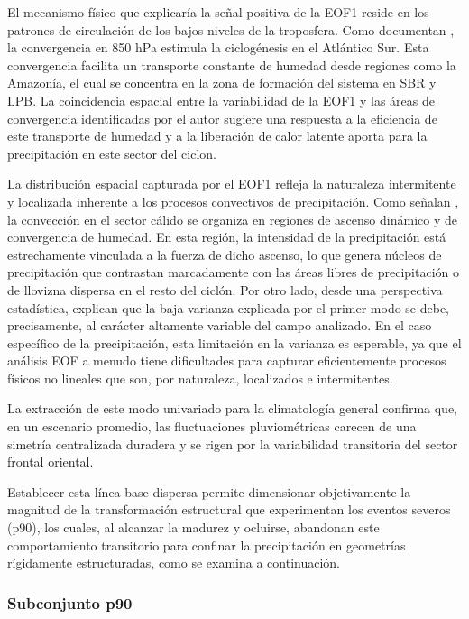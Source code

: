 El mecanismo físico que explicaría la señal positiva de la EOF1 reside en los patrones de circulación de los bajos niveles de la troposfera. 
Como documentan \citet{rocha2016estudo}, la convergencia en 850 hPa estimula la ciclogénesis en el Atlántico Sur. 
Esta convergencia facilita un transporte constante de humedad desde regiones como la Amazonía, el cual se concentra en la zona de formación del sistema en SBR y LPB. 
La coincidencia espacial entre la variabilidad de la EOF1 y las áreas de convergencia identificadas por el autor sugiere una respuesta a la eficiencia de este transporte de humedad y a la liberación de calor latente aporta para la precipitación en este sector del ciclon.

La distribución espacial capturada por el EOF1 refleja la naturaleza intermitente y localizada inherente a los procesos convectivos de precipitación. 
Como señalan \citet{naud2020evaluation}, la convección en el sector cálido se organiza en regiones de ascenso dinámico y de convergencia de humedad. 
En esta región, la intensidad de la precipitación está estrechamente vinculada a la fuerza de dicho ascenso, lo que genera núcleos de precipitación que contrastan marcadamente con las áreas libres de precipitación o de llovizna dispersa en el resto del ciclón. 
Por otro lado, desde una perspectiva estadística, \citet{hannachi2007empirical} explican que la baja varianza explicada por el primer modo se debe, precisamente, al carácter altamente variable del campo analizado. 
En el caso específico de la precipitación, esta limitación en la varianza es esperable, ya que el análisis EOF a menudo tiene dificultades para capturar eficientemente procesos físicos no lineales que son, por naturaleza, localizados e intermitentes.

La extracción de este modo univariado para la climatología general confirma que, en un escenario promedio, las fluctuaciones pluviométricas carecen de una simetría centralizada duradera y se rigen por la variabilidad transitoria del sector frontal oriental.

Establecer esta línea base dispersa permite dimensionar objetivamente la magnitud de la transformación estructural que experimentan los eventos severos (p90), los cuales, al alcanzar la madurez y ocluirse, abandonan este comportamiento transitorio para confinar la precipitación en geometrías rígidamente estructuradas, como se examina a continuación.
 
\subsubsection{Subconjunto p90}\label{subsubsec:eof1_tp_p90}
 
